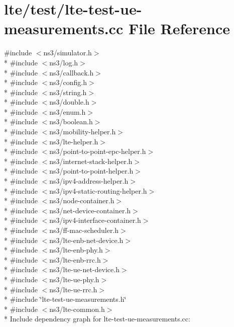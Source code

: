 \hypertarget{lte-test-ue-measurements_8cc}{}\section{lte/test/lte-\/test-\/ue-\/measurements.cc File Reference}
\label{lte-test-ue-measurements_8cc}
{\ttfamily \#include $<$ns3/simulator.\+h$>$}\\*
{\ttfamily \#include $<$ns3/log.\+h$>$}\\*
{\ttfamily \#include $<$ns3/callback.\+h$>$}\\*
{\ttfamily \#include $<$ns3/config.\+h$>$}\\*
{\ttfamily \#include $<$ns3/string.\+h$>$}\\*
{\ttfamily \#include $<$ns3/double.\+h$>$}\\*
{\ttfamily \#include $<$ns3/enum.\+h$>$}\\*
{\ttfamily \#include $<$ns3/boolean.\+h$>$}\\*
{\ttfamily \#include $<$ns3/mobility-\/helper.\+h$>$}\\*
{\ttfamily \#include $<$ns3/lte-\/helper.\+h$>$}\\*
{\ttfamily \#include $<$ns3/point-\/to-\/point-\/epc-\/helper.\+h$>$}\\*
{\ttfamily \#include $<$ns3/internet-\/stack-\/helper.\+h$>$}\\*
{\ttfamily \#include $<$ns3/point-\/to-\/point-\/helper.\+h$>$}\\*
{\ttfamily \#include $<$ns3/ipv4-\/address-\/helper.\+h$>$}\\*
{\ttfamily \#include $<$ns3/ipv4-\/static-\/routing-\/helper.\+h$>$}\\*
{\ttfamily \#include $<$ns3/node-\/container.\+h$>$}\\*
{\ttfamily \#include $<$ns3/net-\/device-\/container.\+h$>$}\\*
{\ttfamily \#include $<$ns3/ipv4-\/interface-\/container.\+h$>$}\\*
{\ttfamily \#include $<$ns3/ff-\/mac-\/scheduler.\+h$>$}\\*
{\ttfamily \#include $<$ns3/lte-\/enb-\/net-\/device.\+h$>$}\\*
{\ttfamily \#include $<$ns3/lte-\/enb-\/phy.\+h$>$}\\*
{\ttfamily \#include $<$ns3/lte-\/enb-\/rrc.\+h$>$}\\*
{\ttfamily \#include $<$ns3/lte-\/ue-\/net-\/device.\+h$>$}\\*
{\ttfamily \#include $<$ns3/lte-\/ue-\/phy.\+h$>$}\\*
{\ttfamily \#include $<$ns3/lte-\/ue-\/rrc.\+h$>$}\\*
{\ttfamily \#include \char`\"{}lte-\/test-\/ue-\/measurements.\+h\char`\"{}}\\*
{\ttfamily \#include $<$ns3/lte-\/common.\+h$>$}\\*
Include dependency graph for lte-\/test-\/ue-\/measurements.cc\+:
